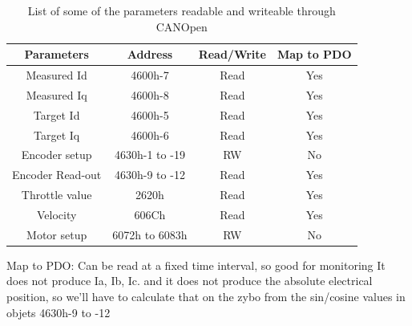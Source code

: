 \begin{table}
	\centering
	\begin{tabular}{| c | c | c | c |}
		\hline
		Parameters & Address & Read/Write & Map to PDO \\ %
		\hline
		Measured Id & 4600h-7 & Read & Yes \\ %
		Measured Iq & 4600h-8 & Read & Yes \\ %
		Target Id & 4600h-5 & Read & Yes \\ %
		Target Iq & 4600h-6 & Read & Yes \\ %
		Encoder setup & 4630h-1 to -19 & RW & No \\%
		Encoder Read-out & 4630h-9 to -12 & Read & Yes \\ %
		Throttle value & 2620h & Read & Yes \\ %
		Velocity & 606Ch & Read & Yes \\ %
		Motor setup & 6072h to 6083h & RW & No \\ %
		\hline	
	\end{tabular}
	\caption{List of some of the parameters readable and writeable through CANOpen}
	\label{tab:parameters_of_interest}
\end{table}

Map to PDO: Can be read at a fixed time interval, so good for monitoring
It does not produce Ia, Ib, Ic. and it does not produce the absolute electrical position, so we'll have to calculate that on the zybo from the sin/cosine values in objets 4630h-9 to -12

